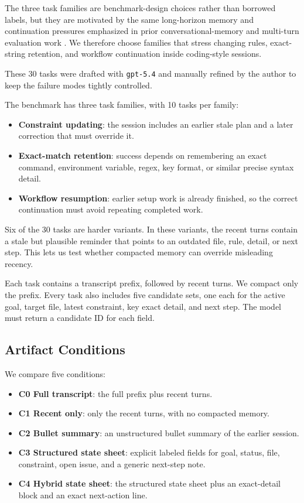 \documentclass[11pt]{article}
\begin{document}
The three task families are benchmark-design choices rather than borrowed labels, but they are motivated by the same long-horizon memory and continuation pressures emphasized in prior conversational-memory and multi-turn evaluation work \citep{maharana-etal-2024-evaluating, jia-etal-2025-evaluating, katsis-etal-2025-mt}. We therefore choose families that stress changing rules, exact-string retention, and workflow continuation inside coding-style sessions.

These 30 tasks were drafted with \texttt{gpt-5.4} and manually refined by the author to keep the failure modes tightly controlled.

The benchmark has three task families, with 10 tasks per family:
\begin{itemize}
    \item \textbf{Constraint updating}: the session includes an earlier stale plan and a later correction that must override it.
    \item \textbf{Exact-match retention}: success depends on remembering an exact command, environment variable, regex, key format, or similar precise syntax detail.
    \item \textbf{Workflow resumption}: earlier setup work is already finished, so the correct continuation must avoid repeating completed work.
\end{itemize}

Six of the 30 tasks are harder variants. In these variants, the recent turns contain a stale but plausible reminder that points to an outdated file, rule, detail, or next step. This lets us test whether compacted memory can override misleading recency.

Each task contains a transcript prefix, followed by recent turns. We compact only the prefix. Every task also includes five candidate sets, one each for the active goal, target file, latest constraint, key exact detail, and next step. The model must return a candidate ID for each field.

\subsection{Artifact Conditions}
We compare five conditions:
\begin{itemize}
    \item \textbf{C0 Full transcript}: the full prefix plus recent turns.
    \item \textbf{C1 Recent only}: only the recent turns, with no compacted memory.
    \item \textbf{C2 Bullet summary}: an unstructured bullet summary of the earlier session.
    \item \textbf{C3 Structured state sheet}: explicit labeled fields for goal, status, file, constraint, open issue, and a generic next-step note.
    \item \textbf{C4 Hybrid state sheet}: the structured state sheet plus an exact-detail block and an exact next-action line.
\end{itemize}
\end{document}
